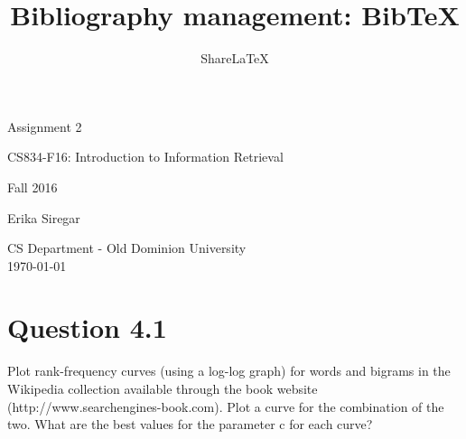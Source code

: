 \documentclass[letterpaper,11pt]{article}
\title{Bibliography management: BibTeX}
\author{Share\LaTeX}
\begin{document}
\begin{titlepage}

\begin{center}

\Huge{Assignment 2}

\Large{CS834-F16:  Introduction to Information Retrieval}

\Large{Fall 2016}


\Large{Erika Siregar}

\vfill

\Large{CS Department - Old Dominion University  \\ \today}


\end{center}

\end{titlepage}


\section*{Question 4.1}
\begin{spverbatim}
Plot rank-frequency curves (using a log-log graph) for words and bigrams in the Wikipedia collection available through the book website (http://www.searchengines-book.com). Plot a curve for the combination of the two. What are the best values for the parameter c for each curve?
\end{spverbatim}
\end{document}
